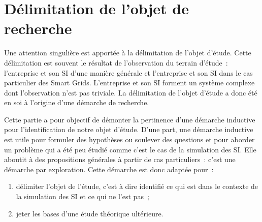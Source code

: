 %


	\section{Délimitation de l'objet de recherche}
		
	Une attention singulière est apportée à la délimitation de l'objet d'étude. 
Cette délimitation est souvent le résultat de l'observation du terrain d'étude~: 
l'entreprise et son SI d'une manière générale et l'entreprise et son SI dans le 
cas particulier des Smart Grids. L'entreprise et son SI forment un système 
complexe dont l'observation n'est pas triviale. La délimitation de l'objet 
d'étude a donc été en soi à l'origine d'une démarche de recherche.
	
	Cette partie a pour objectif de démonter la pertinence d'une démarche inductive 
pour l'identification de notre objet d'étude. D'une part, une démarche inductive 
est utile pour formuler des hypothèses ou soulever des questions et pour aborder 
un problème qui a été peu étudié comme c'est le cas de la simulation des SI. 
Elle aboutit à des propositions générales à partir de cas particuliers~: c'est 
une démarche par exploration. 
	Cette démarche est donc adaptée pour~: 
	\begin{enumerate}
	\item délimiter l'objet de l'étude, c'est à dire identifié ce qui est dans le 
contexte de la simulation des SI et ce qui ne l'est pas~;
	\item jeter les bases d'une étude théorique ultérieure.
	\end{enumerate}
	
